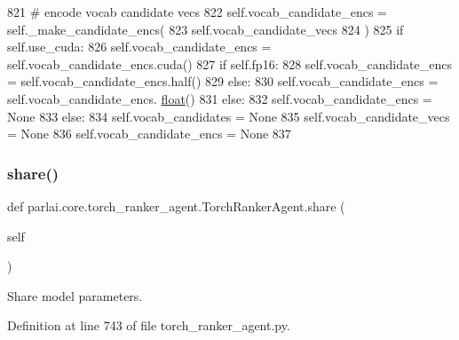 \begin{DoxyCode}
821                     \textcolor{comment}{# encode vocab candidate vecs}
822                     self.vocab\_candidate\_encs = self.\_make\_candidate\_encs(
823                         self.vocab\_candidate\_vecs
824                     )
825                     \textcolor{keywordflow}{if} self.use\_cuda:
826                         self.vocab\_candidate\_encs = self.vocab\_candidate\_encs.cuda()
827                     \textcolor{keywordflow}{if} self.fp16:
828                         self.vocab\_candidate\_encs = self.vocab\_candidate\_encs.half()
829                     \textcolor{keywordflow}{else}:
830                         self.vocab\_candidate\_encs = self.vocab\_candidate\_encs.
      \hyperlink{namespaceprojects_1_1controllable__dialogue_1_1make__control__dataset_aa2b7207688c641dbc094ab44eca27113}{float}()
831                 \textcolor{keywordflow}{else}:
832                     self.vocab\_candidate\_encs = \textcolor{keywordtype}{None}
833             \textcolor{keywordflow}{else}:
834                 self.vocab\_candidates = \textcolor{keywordtype}{None}
835                 self.vocab\_candidate\_vecs = \textcolor{keywordtype}{None}
836                 self.vocab\_candidate\_encs = \textcolor{keywordtype}{None}
837 
\end{DoxyCode}
\mbox{\label{classparlai_1_1core_1_1torch__ranker__agent_1_1TorchRankerAgent_a9ba5899b6497645bb6d406ecc2441da7}} 
\subsubsection{\texorpdfstring{share()}{share()}}
{\footnotesize\ttfamily def parlai.\+core.\+torch\+\_\+ranker\+\_\+agent.\+Torch\+Ranker\+Agent.\+share (\begin{DoxyParamCaption}\item[{}]{self }\end{DoxyParamCaption})}

\begin{DoxyVerb}Share model parameters.
\end{DoxyVerb}
 

Definition at line 743 of file torch\+\_\+ranker\+\_\+agent.\+py.


